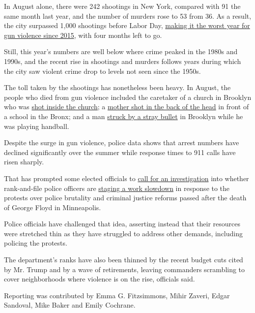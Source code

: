 In August alone, there were 242 shootings in New York, compared with 91
the same month last year, and the number of murders rose to 53 from 36.
As a result, the city surpassed 1,000 shootings before Labor Day,
\href{https://www.nytimes3xbfgragh.onion/2017/01/04/nyregion/new-york-shootings-decline.html}{making
it the worst year for gun violence since 2015}, with four months left to
go.

Still, this year's numbers are well below where crime peaked in the
1980s and 1990s, and the recent rise in shootings and murders follows
years during which the city saw violent crime drop to levels not seen
since the 1950s.

The toll taken by the shootings has nonetheless been heavy. In August,
the people who died from gun violence included the caretaker of a church
in Brooklyn who was
\href{https://abc7ny.com/beloved-caretaker-fatally-shot-inside-brooklyn-church/6397695/}{shot
inside the church}; a
\href{https://newyork.cbslocal.com/2020/08/22/bronx-mother-fatally-shot-nyc-shootings/}{mother
shot in the back of the head} in front of a school in the Bronx; and a
man
\href{https://www.nydailynews.com/new-york/nyc-crime/ny-handball-stray-bullet-park-shooting-20200810-x6dbbqmkzvchrkpfyqo3hpfvoq-story.html}{struck
by a stray bullet} in Brooklyn while he was playing handball.

Despite the surge in gun violence, police data shows that arrest numbers
have declined significantly over the summer while response times to 911
calls have risen sharply.

That has prompted some elected officials to
\href{https://abc7ny.com/nypd-work-slowdown-nyc-crime-violence-shootings/6396831/}{call
for an investigation} into whether rank-and-file police officers are
\href{https://www.nytimes3xbfgragh.onion/2020/07/16/nyregion/nyc-shootings-nypd.html}{staging
a work slowdown} in response to the protests over police brutality and
criminal justice reforms passed after the death of George Floyd in
Minneapolis.

Police officials have challenged that idea, asserting instead that their
resources were stretched thin as they have struggled to address other
demands, including policing the protests.

The department's ranks have also been thinned by the recent budget cuts
cited by Mr. Trump and by a wave of retirements, leaving commanders
scrambling to cover neighborhoods where violence is on the rise,
officials said.

Reporting was contributed by Emma G. Fitzsimmons, Mihir Zaveri, Edgar
Sandoval, Mike Baker and Emily Cochrane.

